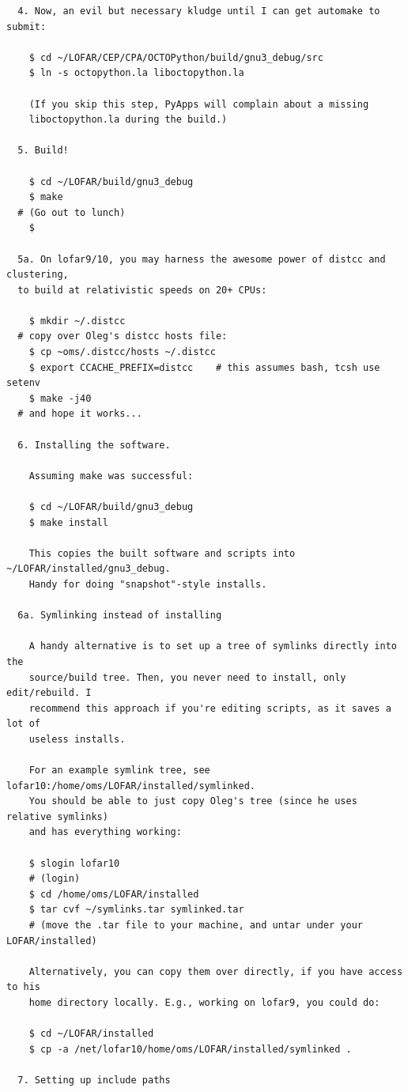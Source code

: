 \documentclass[10pt]{article}
\begin{document}
\begin{verbatim}
  4. Now, an evil but necessary kludge until I can get automake to submit:

    $ cd ~/LOFAR/CEP/CPA/OCTOPython/build/gnu3_debug/src
    $ ln -s octopython.la liboctopython.la

    (If you skip this step, PyApps will complain about a missing 
    liboctopython.la during the build.)

  5. Build!

    $ cd ~/LOFAR/build/gnu3_debug
    $ make 
  # (Go out to lunch)
    $

  5a. On lofar9/10, you may harness the awesome power of distcc and clustering, 
  to build at relativistic speeds on 20+ CPUs:

    $ mkdir ~/.distcc
  # copy over Oleg's distcc hosts file:
    $ cp ~oms/.distcc/hosts ~/.distcc
    $ export CCACHE_PREFIX=distcc    # this assumes bash, tcsh use setenv
    $ make -j40 
  # and hope it works...

  6. Installing the software.

    Assuming make was successful:

    $ cd ~/LOFAR/build/gnu3_debug
    $ make install

    This copies the built software and scripts into ~/LOFAR/installed/gnu3_debug.
    Handy for doing "snapshot"-style installs. 

  6a. Symlinking instead of installing

    A handy alternative is to set up a tree of symlinks directly into the
    source/build tree. Then, you never need to install, only edit/rebuild. I 
    recommend this approach if you're editing scripts, as it saves a lot of
    useless installs. 

    For an example symlink tree, see lofar10:/home/oms/LOFAR/installed/symlinked.
    You should be able to just copy Oleg's tree (since he uses relative symlinks) 
    and has everything working:

    $ slogin lofar10
    # (login)
    $ cd /home/oms/LOFAR/installed
    $ tar cvf ~/symlinks.tar symlinked.tar
    # (move the .tar file to your machine, and untar under your LOFAR/installed)

    Alternatively, you can copy them over directly, if you have access to his
    home directory locally. E.g., working on lofar9, you could do:

    $ cd ~/LOFAR/installed
    $ cp -a /net/lofar10/home/oms/LOFAR/installed/symlinked .

  7. Setting up include paths


\end{verbatim}
\end{document}
